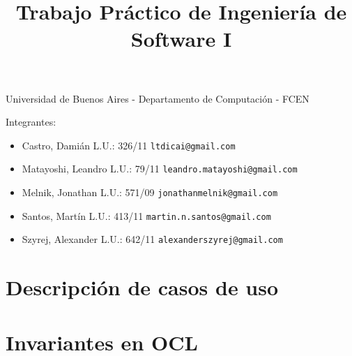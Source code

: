 \documentclass[a4paper,11pt]{article}
\title{Trabajo Práctico de Ingeniería de Software I}
\begin{document}
\maketitle

\begin{center}
	Universidad de Buenos Aires - Departamento de Computaci\'on - FCEN
\end{center}

\vspace{2cm}
Integrantes:

\begin{itemize}
	\item Castro, Dami\'an L.U.: 326/11  \verb+ltdicai@gmail.com+
	\item Matayoshi, Leandro L.U.: 79/11 \verb+leandro.matayoshi@gmail.com+
	\item Melnik, Jonathan L.U.: 571/09 \verb+jonathanmelnik@gmail.com+
	\item Santos, Martín L.U.: 413/11 \verb+martin.n.santos@gmail.com+
	\item Szyrej, Alexander L.U.: 642/11   \verb+alexanderszyrej@gmail.com+
	
\end{itemize}

\newpage

\tableofcontents

\newpage

\section{Descripción de casos de uso}





\section{Invariantes en OCL}


\end{document}
